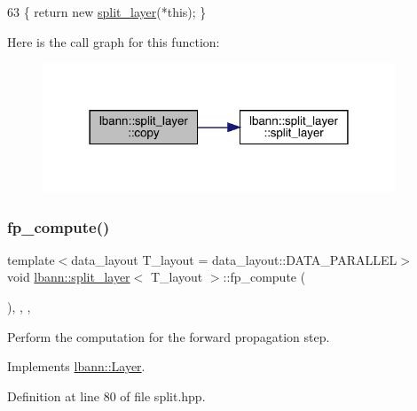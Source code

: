 \begin{DoxyCode}
63 \{ \textcolor{keywordflow}{return} \textcolor{keyword}{new} \hyperlink{classlbann_1_1split__layer_a875f1e07dd924826e7ec62e44f697c3e}{split\_layer}(*\textcolor{keyword}{this}); \}
\end{DoxyCode}
Here is the call graph for this function\+:\nopagebreak
\begin{figure}[H]
\begin{center}
\leavevmode
\includegraphics[width=298pt]{classlbann_1_1split__layer_ae6b974e17e27163c6856b6114b7d6362_cgraph}
\end{center}
\end{figure}
\mbox{\label{classlbann_1_1split__layer_aeb4caccd2675195ce75ae63485f6d402}} 
\subsubsection{\texorpdfstring{fp\+\_\+compute()}{fp\_compute()}}
{\footnotesize\ttfamily template$<$data\+\_\+layout T\+\_\+layout = data\+\_\+layout\+::\+D\+A\+T\+A\+\_\+\+P\+A\+R\+A\+L\+L\+EL$>$ \\
void \hyperlink{classlbann_1_1split__layer}{lbann\+::split\+\_\+layer}$<$ T\+\_\+layout $>$\+::fp\+\_\+compute (\begin{DoxyParamCaption}{ }\end{DoxyParamCaption})\hspace{0.3cm}{\ttfamily [inline]}, {\ttfamily [override]}, {\ttfamily [protected]}, {\ttfamily [virtual]}}

Perform the computation for the forward propagation step. 

Implements \hyperlink{classlbann_1_1Layer_a523319dd1bd87a0612afa1912bb5aad7}{lbann\+::\+Layer}.



Definition at line 80 of file split.\+hpp.


